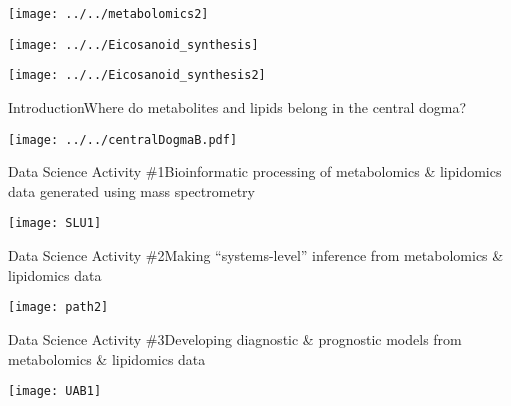 \documentclass[xcolor=dvipsnames]{beamer}
\begin{document}
\begin{frame}
\begin{center}
	\texttt{[image: ../../metabolomics2]}
\end{center}
\addtocounter{framenumber}{-1}
\end{frame}

\begin{frame}
	\begin{center}
		\texttt{[image: ../../Eicosanoid\_synthesis]}
		
	\end{center}
\end{frame}

\begin{frame}
\begin{center}
	\texttt{[image: ../../Eicosanoid\_synthesis2]}
\end{center}
\addtocounter{framenumber}{-1}
\end{frame}

\begin{frame}{Introduction}{Where do metabolites and lipids belong in the central dogma?}
\vspace{-7 pt}
\begin{center}
	\texttt{[image: ../../centralDogmaB.pdf]}
\end{center}
\end{frame}

\begin{frame}{Data Science Activity \#1}{Bioinformatic processing of metabolomics \& lipidomics data generated using mass spectrometry}
\vspace{-15pt}
\begin{center}
	\texttt{[image: SLU1]}
\end{center}
\end{frame}

\begin{frame}{Data Science Activity \#2}{Making ``systems-level'' inference from metabolomics \& lipidomics data}
\vspace{-15pt}
\begin{center}
\texttt{[image: path2]}
\end{center}
\end{frame}

\begin{frame}{Data Science Activity \#3}{Developing diagnostic \& prognostic models from metabolomics \& lipidomics data}
\vspace{-15pt}
\begin{center}
\texttt{[image: UAB1]}
\end{center}
\end{frame}
\end{document}
